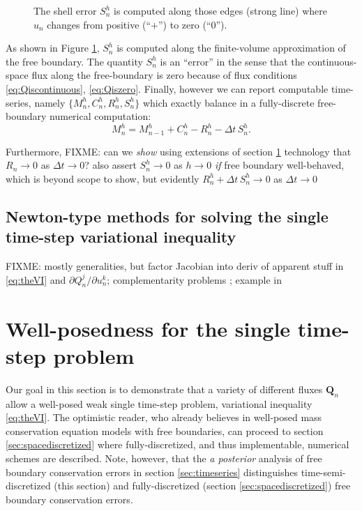 \documentclass[final,leqno,onefignum,onetabnum]{siamltex1213bueler}
\newcommand\bQ{\mathbf{Q}}
\begin{document}
\begin{figure}[ht]
\begin{center}

\end{center}
\caption{The shell error $S_n^h$ is computed along those edges (strong line) where $u_n$ changes from positive (``$+$'') to zero (``$0$'').}
\label{fig:fvmesh-shellerror}
\end{figure}

As shown in Figure \ref{fig:fvmesh-shellerror}, $S_n^h$ is computed along the finite-volume approximation of the free boundary.  The quantity $S_n^h$ is an ``error'' in the sense that the continuous-space flux along the free-boundary is zero because of flux conditions \eqref{eq:Qiscontinuous}, \eqref{eq:Qiszero}.  Finally, however we can report computable time-series, namely $\{M_n^h,C_n^h,R_n^h,S_n^h\}$ which exactly balance in a fully-discrete free-boundary numerical computation:
\begin{equation}
  M_n^h = M_{n-1}^h + C_n^h - R_n^h - \Delta t\,S_n^h. \label{eq:fvfinalbalance}
\end{equation}

Furthermore, FIXME: can we \emph{show} using extensions of section \ref{sec:wellposed} technology that $R_n\to 0$ as $\Delta t\to 0$?  also assert $S_n^h\to 0$ as $h\to 0$ \emph{if} free boundary well-behaved, which is beyond scope to show, but evidently $R_n^h + \Delta t\,S_n^h \to 0$ as $\Delta t\to 0$

\subsection{Newton-type methods for solving the single time-step variational inequality} \label{subsec:newtonvi}  FIXME: mostly generalities, but factor Jacobian into deriv of apparent stuff in \eqref{eq:theVI} and $\partial Q_n^j/\partial u_n^k$; complementarity problems \cite{BensonMunson2006,BillupsMurty2000}; example in \cite{Bueler2015}


\section{Well-posedness for the single time-step problem} \label{sec:wellposed}

Our goal in this section is to demonstrate that a variety of different fluxes $\bQ_n$ allow a well-posed weak single time-step problem, variational inequality \eqref{eq:theVI}.  The optimistic reader, who already believes in well-posed mass conservation equation models with free boundaries, can proceed to section \ref{sec:spacediscretized} where fully-discretized, and thus implementable, numerical schemes are described.  Note, however, that the \emph{a posterior} analysis of free boundary conservation errors in section \ref{sec:timeseries} distinguishes time-semi-discretized (this section) and fully-discretized (section \ref{sec:spacediscretized}) free boundary conservation errors.
\end{document}
